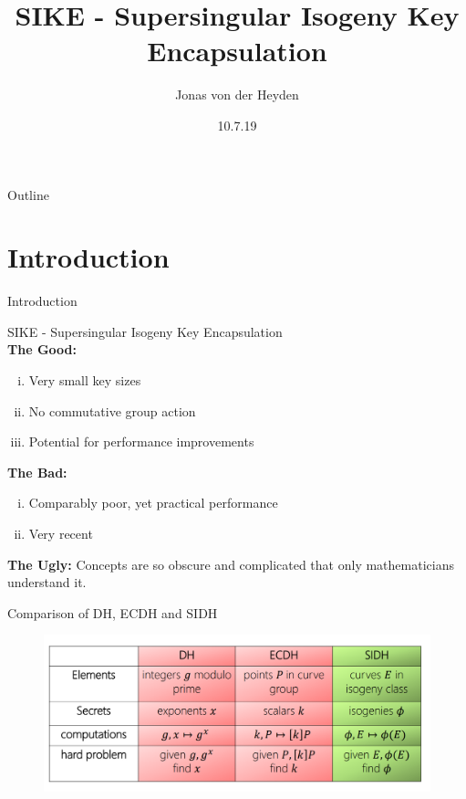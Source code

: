\documentclass[handout]{beamer}
\title[SIKE]{SIKE - Supersingular Isogeny Key Encapsulation}
\author{Jonas von der Heyden}
\institute{FU Berlin}
\date{10.7.19}
\begin{document}
\newcommand{\source}[1]{\caption*{Source: {#1}} } %
\begin{frame}
  \titlepage
\end{frame}

\begin{frame}{Outline}
  \tableofcontents
\end{frame}

\section{Introduction}

\begin{frame}{Introduction}

SIKE - Supersingular Isogeny Key Encapsulation\\
\vspace{5mm}
\textbf{The Good:}
\begin{enumerate}[(i)]
	\item Very small key sizes\pause
	\item No commutative group action\pause
	\item Potential for performance improvements\pause
\end{enumerate}
\vspace{5mm}
\textbf{The Bad:}
\begin{enumerate}[(i)]
	\item Comparably poor, yet practical performance\pause
	\item Very recent\pause
\end{enumerate}

\vfill
\textbf{The Ugly:} Concepts are so obscure and complicated that only mathematicians understand it.


\end{frame}
\begin{frame}{Comparison of DH, ECDH and SIDH}
\begin{figure} %
	\centering
	\includegraphics[width=1\linewidth]{dh_ec_iso}
	\label{fig:dh_ec_iso}
\end{figure}
\end{frame}
\end{document}
